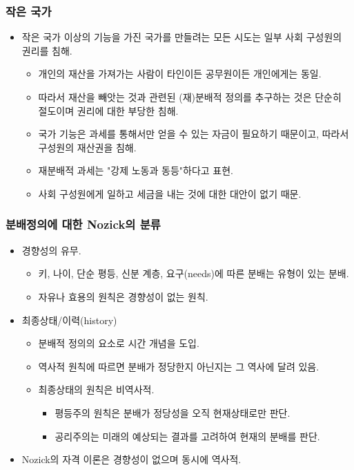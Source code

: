 \documentclass[aspectratio=169,xcolor=dvipsnames,handout]{beamer}
\begin{document}
\begin{frame}[<+->]
\frametitle{작은 국가}
    \begin{itemize}
        \item 작은 국가 이상의 기능을 가진 국가를 만들려는 모든 시도는 일부 사회 구성원의 권리를 침해.
        \begin{itemize}
            \item 개인의 재산을 가져가는 사람이 타인이든 공무원이든 개인에게는 동일.
            \item 따라서 재산을 빼앗는 것과 관련된 (재)분배적 정의를 추구하는 것은 단순히 절도이며 권리에 대한 부당한 침해.
            \item 국가 기능은 과세를 통해서만 얻을 수 있는 자금이 필요하기 때문이고, 따라서 구성원의 재산권을 침해.
            \item 재분배적 과세는 "강제 노동과 동등"하다고 표현.
            \item 사회 구성원에게 일하고 세금을 내는 것에 대한 대안이 없기 때문.
        \end{itemize}
    \end{itemize}
\end{frame}

\begin{frame}[<+->]
\frametitle{분배정의에 대한 Nozick의 분류}
    \begin{itemize}
        \item 경향성의 유무.
        \begin{itemize}
            \item 키, 나이, 단순 평등, 신분 계층, 요구(needs)에 따른 분배는 유형이 있는 분배.
            \item 자유나 효용의 원칙은 경향성이 없는 원칙.
        \end{itemize}
        \item 최종상태/이력(history)
        \begin{itemize}
            \item 분배적 정의의 요소로 시간 개념을 도입.
            \item 역사적 원칙에 따르면 분배가 정당한지 아닌지는 그 역사에 달려 있음.
            \item 최종상태의 원칙은 비역사적.
            \begin{itemize}
                \item 평등주의 원칙은 분배가 정당성을 오직 현재상태로만 판단.
                \item 공리주의는 미래의 예상되는 결과를 고려하여 현재의 분배를 판단.
            \end{itemize}
        \end{itemize}
        \item  Nozick의 자격 이론은 경향성이 없으며 동시에 역사적.
    \end{itemize}
\end{frame}
\end{document}
